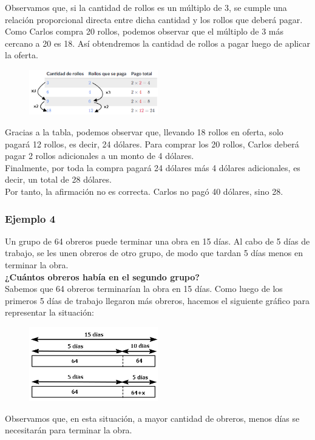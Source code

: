 \documentclass[11pt]{book}
\begin{document}
Observamos que, si la cantidad de rollos es un múltiplo de 3, se cumple una relación proporcional directa entre dicha cantidad y los rollos que deberá pagar.\\

Como Carlos compra 20 rollos, podemos observar que el múltiplo de 3 más cercano a 20 es 18. Así obtendremos la cantidad de rollos a pagar luego de aplicar la oferta.\\

\begin{figure}[H]
  \centering
  \includegraphics[width=0.5\textwidth]{./Unidad 2/Images/tableS8L101.png}
\end{figure}

Gracias a la tabla, podemos observar que, llevando 18 rollos en oferta, solo pagará 12 rollos, es decir, 24 dólares. Para comprar los 20 rollos, Carlos deberá pagar 2 rollos adicionales a un monto de 4 dólares.\\

Finalmente, por toda la compra pagará 24 dólares más 4 dólares adicionales, es decir, un total de 28 dólares.\\

Por tanto, la afirmación no es correcta. Carlos no pagó 40 dólares, sino 28.

\subsubsection{Ejemplo 4}
Un grupo de 64 obreros puede terminar una obra en 15 días. Al cabo de 5 días de trabajo, se les unen obreros de otro grupo, de modo que tardan 5 días menos en terminar la obra.\\
\textbf{¿Cuántos obreros había en el segundo grupo?}\\

Sabemos que 64 obreros terminarían la obra en 15 días. Como luego de los primeros 5 días de trabajo llegaron más obreros, hacemos el siguiente gráfico para representar la situación:
\begin{figure}[H]
  \centering
  \includegraphics[width=0.5\textwidth]{./Unidad 2/Images/tableS8L103.png}
\end{figure}
Observamos que, en esta situación, a mayor cantidad de obreros, menos días se necesitarán para terminar la obra.\\
\end{document}
